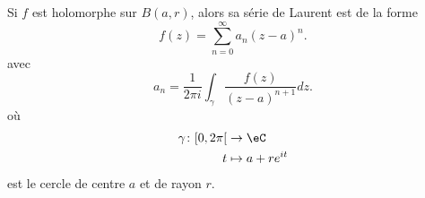 \begin{proposition}     \label{PROPooBMZGooLoaGLK}
	Si \( f\) est holomorphe sur \( B(a,r)\), alors sa série de Laurent est de la forme
	\begin{equation}
		f(z)=\sum_{n=0}^{\infty}a_n(z-a)^n.
	\end{equation}
	avec
	\begin{equation}
		a_n=\frac{1}{ 2\pi i }\int_{\gamma}\frac{ f(z) }{ (z-a)^{n+1} }dz.
	\end{equation}
	où
	\begin{equation}
		\begin{aligned}
			\gamma\colon \mathopen[ 0 , 2\pi \mathclose[ & \to \eC            \\
			t                                            & \mapsto a+ re^{it}
		\end{aligned}
	\end{equation}
	est le cercle de centre \( a\) et de rayon \( r\).
\end{proposition}
